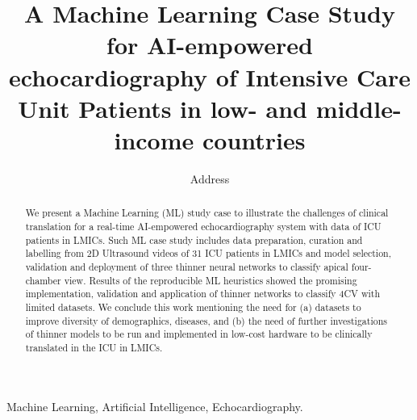 \documentclass[mlabstract,twocolumn]{jmlr}
\title[Short Title]{
A Machine Learning Case Study for AI-empowered echocardiography of Intensive Care Unit Patients in low- and middle-income countries  %
}
\author{
     \Name{Anonymous Author(s)} \Email{email@sample.com}
      \addr Address
   }
\begin{document}
\maketitle

\begin{abstract}
We present a Machine Learning (ML) study case to illustrate the challenges of clinical translation for a real-time AI-empowered echocardiography system with data of ICU patients in LMICs.
Such ML case study includes data preparation, curation and labelling from 2D Ultrasound videos of 31 ICU patients in LMICs and model selection, validation and deployment of three thinner neural networks to classify apical four-chamber view.
Results of the reproducible ML heuristics showed the promising implementation, validation and application of thinner networks to classify 4CV with limited datasets.
We conclude this work mentioning the need for (a) datasets to improve diversity of demographics, diseases, and (b) the need of further investigations of thinner models to be run and implemented in low-cost hardware to be clinically translated in the ICU in LMICs.
\end{abstract}
\begin{keywords}
Machine Learning, Artificial Intelligence, Echocardiography.
\end{keywords}
\end{document}
